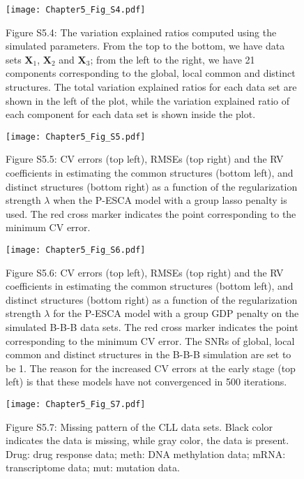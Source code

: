 \begin{figure}[htbp]
    \centering
    \texttt{[image: Chapter5\_Fig\_S4.pdf]}
    \caption*{Figure S5.4: The variation explained ratios computed using the simulated parameters. From the top to the bottom, we have data sets $\mathbf{X}_1$, $\mathbf{X}_2$ and $\mathbf{X}_3$; from the left to the right, we have 21 components corresponding to the global, local common and distinct structures. The total variation explained ratios for each data set are shown in the left of the plot, while the variation explained ratio of each component for each data set is shown inside the plot.}
	\label{chapter5_fig:S4}
\end{figure}

\begin{figure}[htbp]
    \centering
    \texttt{[image: Chapter5\_Fig\_S5.pdf]}
    \caption*{Figure S5.5: CV errors (top left), RMSEs (top right) and the RV coefficients in estimating the common structures (bottom left), and distinct structures (bottom right) as a function of the regularization strength $\lambda$ when the P-ESCA model with a group lasso penalty is used. The red cross marker indicates the point corresponding to the minimum CV error.}
	\label{chapter5_fig:S5}
\end{figure}

\begin{figure}[htbp]
    \centering
    \texttt{[image: Chapter5\_Fig\_S6.pdf]}
    \caption*{Figure S5.6: CV errors (top left), RMSEs (top right) and the RV coefficients in estimating the common structures (bottom left), and distinct structures (bottom right) as a function of the regularization strength $\lambda$ for the P-ESCA model with a group GDP penalty on the simulated B-B-B data sets. The red cross marker indicates the point corresponding to the minimum CV error. The SNRs of global, local common and distinct structures in the B-B-B simulation are set to be 1. The reason for the increased CV errors at the early stage (top left) is that these models have not convergenced in 500 iterations.}
	\label{chapter5_fig:S6}
\end{figure}

\begin{figure}[htbp]
    \centering
    \texttt{[image: Chapter5\_Fig\_S7.pdf]}
    \caption*{Figure S5.7: Missing pattern of the CLL data sets. Black color indicates the data is missing, while gray color, the data is present. Drug: drug response data; meth: DNA methylation data; mRNA: transcriptome data; mut: mutation data.}
	\label{chapter5_fig:S7}
\end{figure}

